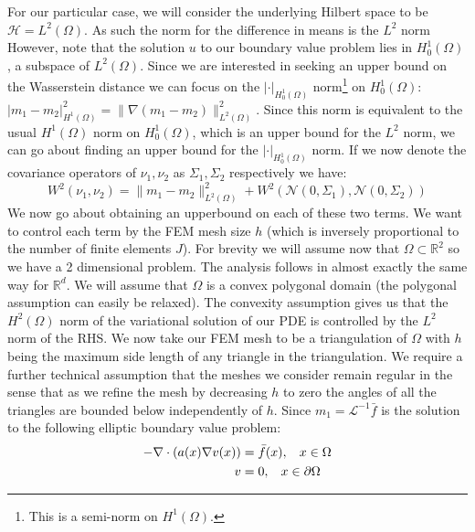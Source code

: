 \documentclass{article}
\theoremstyle{definition}
\theoremstyle{remark}
\begin{document}
For our particular case, we will consider the underlying Hilbert space to be $\mathcal{H}=L^{2}(\Omega)$. As such the norm for the difference in means is the $L^{2}$ norm However, note that the solution $u$ to our boundary value problem lies in $H^{1}_{0}(\Omega)$, a subspace of $L^{2}(\Omega)$. Since we are interested in seeking an upper bound on the Wasserstein distance we can focus on the $|\cdot|_{H^{1}_{0}(\Omega)}$ norm\footnote{This is a semi-norm on $H^{1}(\Omega)$.} on $H_{0}^{1}(\Omega)$: $|m_1-m_2|_{H^1(\Omega)}^{2}=\|\nabla(m_1-m_2)\|_{L^2(\Omega)}^{2}$. Since this norm is equivalent to the usual $H^1(\Omega)$ norm on $H_{0}^{1}(\Omega)$, which is an upper bound for the $L^{2}$ norm, we can go about finding an upper bound for the $|\cdot|_{H_{0}^{1}(\Omega)}$ norm. If we now denote the covariance operators of $\nu_{1},\nu_{2}$ as $\Sigma_{1},\Sigma_{2}$ respectively we have:
\begin{equation*}
    W^{2}(\nu_1,\nu_2)=\|m_1-m_2\|_{L^{2}(\Omega)}^{2}+W^{2}(\mathcal{N}(0,\Sigma_1),\mathcal{N}(0,\Sigma_2))
\end{equation*}
We now go about obtaining an upperbound on each of these two terms. We want to control each term by the FEM mesh size $h$ (which is inversely proportional to the number of finite elements $J$). For brevity we will assume now that $\Omega\subset\mathbb{R}^{2}$ so we have a 2 dimensional problem. The analysis follows in almost exactly the same way for $\mathbb{R}^{d}$. We will assume that $\Omega$ is a convex polygonal domain (the polygonal assumption can easily be relaxed). The convexity assumption gives us that the $H^2(\Omega)$ norm of the variational solution of our PDE is controlled by the $L^2$ norm of the RHS. We now take our FEM mesh to be a triangulation of $\Omega$ with $h$ being the maximum side length of any triangle in the triangulation. We require a further technical assumption that the meshes we consider remain regular in the sense that as we refine the mesh by decreasing $h$ to zero the angles of all the triangles are bounded below independently of $h$. Since $m_1=\mathcal{L}^{-1}\bar{f}$ is the solution to the following elliptic boundary value problem:
\begin{align*}
    \begin{split}
        -\nabla\cdot(a(x)\nabla v(x))&=\bar{f}(x), \hspace{0.3cm} x\in\Omega \\
        v&=0, \hspace{0.3cm} x\in\partial\Omega
    \end{split}
\end{align*}
\end{document}
